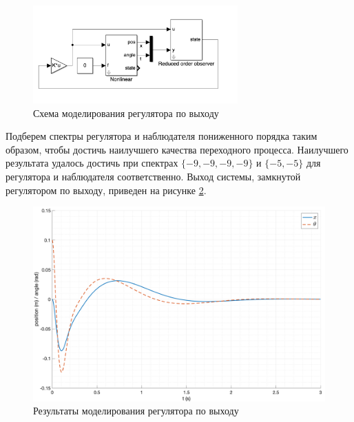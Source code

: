 \begin{figure}[ht!]
    \centering
    \includegraphics[width=0.7\textwidth]{media/model_controller_observer.png}
    \caption{Схема моделирования регулятора по выходу}
    \label{fig:modal_controller_obderver}
\end{figure} 

Подберем спектры регулятора и наблюдателя пониженного порядка таким образом, чтобы 
достичь наилучшего качества переходного процесса. Наилучшего результата удалось достичь при
спектрах $\{-9, -9, -9, -9\}$ и $\{-5, -5\}$ для регулятора и наблюдателя соответственно. 
Выход системы, замкнутой регулятором по выходу, приведен на рисунке \ref{fig:modal_controller_obderver_out}.
\begin{figure}[ht!]
    \centering
    \includegraphics[width=\textwidth]{media/plots/observer_controller/observer_controller_out.png}
    \caption{Результаты моделирования регулятора по выходу}
    \label{fig:modal_controller_obderver_out}
\end{figure}

